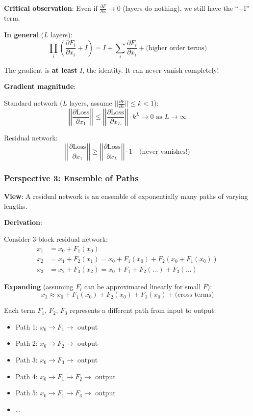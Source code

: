 \textbf{Critical observation}: Even if $\frac{\partial F}{\partial x} \to 0$ (layers do nothing), we still have the ``+I'' term.

\textbf{In general} ($L$ layers):
\[
\prod_i \left(\frac{\partial F_i}{\partial x_i} + I\right) = I + \sum_i \frac{\partial F_i}{\partial x_i} + \text{(higher order terms)}
\]

The gradient is \textbf{at least} $I$, the identity. It can never vanish completely!

\textbf{Gradient magnitude}:

Standard network ($L$ layers, assume $||\frac{\partial F}{\partial x}|| \leq k < 1$):
\[
\left|\left|\frac{\partial \text{Loss}}{\partial x_1}\right|\right| \leq \left|\left|\frac{\partial \text{Loss}}{\partial x_L}\right|\right| \cdot k^L \to 0 \text{ as } L \to \infty
\]

Residual network:
\[
\left|\left|\frac{\partial \text{Loss}}{\partial x_1}\right|\right| \geq \left|\left|\frac{\partial \text{Loss}}{\partial x_L}\right|\right| \cdot 1 \quad \text{(never vanishes!)}
\]

\subsubsection{Perspective 3: Ensemble of Paths}

\textbf{View}: A residual network is an ensemble of exponentially many paths of varying lengths.

\textbf{Derivation}:

Consider 3-block residual network:
\begin{align*}
x_1 &= x_0 + F_1(x_0) \\
x_2 &= x_1 + F_2(x_1) = x_0 + F_1(x_0) + F_2(x_0 + F_1(x_0)) \\
x_3 &= x_2 + F_3(x_2) = x_0 + F_1 + F_2(\ldots) + F_3(\ldots)
\end{align*}

\textbf{Expanding} (assuming $F_i$ can be approximated linearly for small $F$):
\[
x_3 \approx x_0 + F_1(x_0) + F_2(x_0) + F_3(x_0) + \text{(cross terms)}
\]

Each term $F_1$, $F_2$, $F_3$ represents a different path from input to output:
\begin{itemize}
\item Path 1: $x_0 \to F_1 \to$ output
\item Path 2: $x_0 \to F_2 \to$ output
\item Path 3: $x_0 \to F_3 \to$ output
\item Path 4: $x_0 \to F_1 \to F_2 \to$ output
\item Path 5: $x_0 \to F_1 \to F_3 \to$ output
\item \ldots
\end{itemize}

